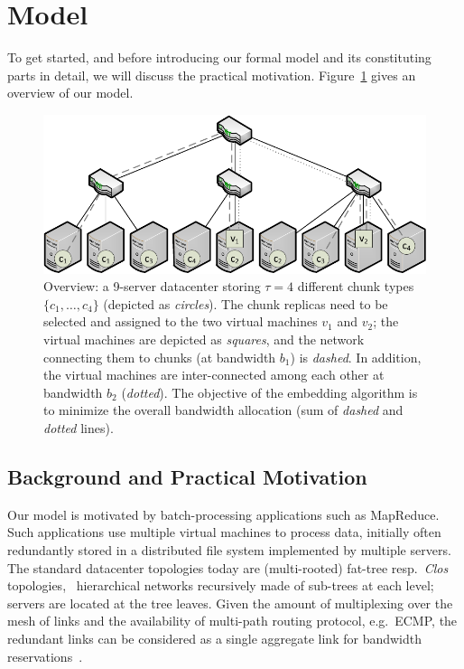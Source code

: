 \documentclass[9pt]{sigcomm-alternate}
\newcommand{\CostTrans}{\ensuremath{b_1}}
\newcommand{\CostCom}{\ensuremath{b_2}}
\begin{document}
\section{Model}\label{sec:model}

To get started, and before introducing our formal model and its constituting parts in detail,
we will discuss the practical motivation.
Figure~\ref{fig:overview} gives an overview of our model.

\begin{figure}[t]
\centering
\includegraphics[width=0.99\columnwidth]{figs/data_locality_no_legend.pdf}
\caption{Overview: a 9-server datacenter storing $\tau=4$ different chunk
types $\{c_1,\ldots,c_4\}$ (depicted as \emph{circles}). The chunk replicas need to be selected and assigned to the two
 virtual machines $v_1$ and $v_2$; the virtual machines are depicted as \emph{squares}, and
 the network connecting them to chunks (at bandwidth $\CostTrans$) is \emph{dashed}. In addition, the virtual machines are inter-connected among
 each other at bandwidth $\CostCom$ (\emph{dotted}). The objective of the embedding algorithm is to minimize the overall bandwidth allocation
 (sum of \emph{dashed} and \emph{dotted} lines).}\label{fig:overview}
\end{figure}


\subsection{Background and Practical Motivation}

Our model is motivated by batch-processing applications such as MapReduce.
Such applications use multiple virtual machines to
process data, initially often redundantly stored in a distributed file system implemented
by multiple servers.~\cite{mapreduce}
The standard datacenter topologies today are (multi-rooted) fat-tree resp.~\emph{Clos} topologies,~\cite{fattree,vl2}
hierarchical networks  recursively made of sub-trees at each level;
servers are located at the
tree leaves. Given the amount of multiplexing over the mesh of links
and the availability of multi-path routing protocol, e.g.~ECMP, the redundant
links can be considered as a single aggregate link for bandwidth
reservations~\cite{oktopus,proteus}.
\end{document}
